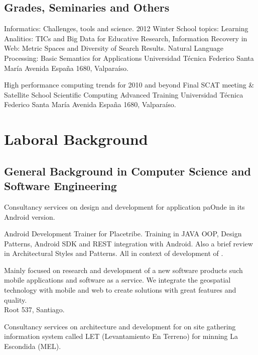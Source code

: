 \documentclass[11pt,letterpaper,roman]{moderncv}
\begin{document}
\subsection{Grades, Seminaries and Others}

	{Informatics: Challenges, tools and science.}
	{2012 Winter School}
	{topics: Learning Analitics: TICs and Big Data for Educative Research, Information Recovery in Web: Metric Spaces and Diversity of Search Results. Natural Language Processing: Basic Semantics for Applications }
	{Universidad T\'ecnica Federico Santa Mar\'ia}
	{Avenida España 1680, Valpara\'iso.}
	
	
	{High performance computing trends for 2010 and beyond}
	{Final SCAT meeting \& Satellite School}
	{Scientific Computing Advanced Training}
	{Universidad T\'ecnica Federico Santa Mar\'ia}
	{Avenida España 1680, Valpara\'iso.}


\section{Laboral Background}

\subsection{General Background in Computer Science and Software Engineering}


	 {\scd} {\paonde} {\stgo} {}
	{Consultancy services on design and development for application paOnde
	in its Android version.} 

	 {\tchr} {\placetribe} {\stgo} {}
	{Android Development Trainer for Placetribe. Training in JAVA
	OOP, Design Patterns, Android SDK and REST integration with Android. Also a
	brief review in Architectural Styles and Patterns. All in context of development
	of \placetribeapp.}

	 {\cf} {\ingennia} {\stgo} {}
	{Mainly focused on research and development of a new software products
	such mobile applications and software as a service. We integrate the geospatial
	technology with mobile and web to create solutions with great features and
	quality. \\ Root 537, Santiago.}

	 {\scd} {\jobbitgames} {\stgo} {}
	{Consultancy services on architecture and development for on site
	gathering information system called LET (Levantamiento En Terreno) for minning
	La Escondida (MEL).} 
\end{document}
